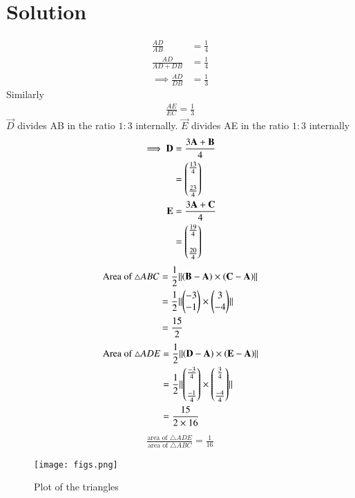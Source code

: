 \documentclass[journal,12pt,twocolumn]{IEEEtran}
\begin{document}
\section{Solution}
\begin{align}
    \frac{AD}{AB}&=\frac{1}{4}\\
    \frac{AD}{AD+DB}&=\frac{1}{4}\\
    \implies \frac{AD}{DB}&=\frac{1}{3}
\end{align}
Similarly
\begin{align}
    \frac{AE}{EC}=\frac{1}{3}
\end{align}
$\vec{D}$ divides AB in the ratio $1:3$ internally. $\vec{E}$ divides AE in the ratio $1:3$ internally
\begin{align}
    \implies \mathbf{D} &=\frac{3\mathbf{A}+\mathbf{B}}{4}\\
    &=\begin{pmatrix}\frac{13}{4}\\\\\frac{23}{4}\end{pmatrix}\\
    \mathbf{E} &=\frac{3\mathbf{A}+\mathbf{C}}{4}\\
    &=\begin{pmatrix}\frac{19}{4}\\\\\frac{20}{4}\end{pmatrix}
\end{align}
\begin{align}
    \text{Area of } \triangle ABC &= \frac{1}{2}\lVert\left(\mathbf{B-A}\right) \times \left(\mathbf{C-A}\right)\rVert\\
    &=\frac{1}{2}\lVert\begin{pmatrix}-3\\-1\end{pmatrix}\times \begin{pmatrix}3\\-4\end{pmatrix}\rVert\\
    &=\frac{15}{2}
\end{align}
\begin{align}
    \text{Area of } \triangle ADE &= \frac{1}{2}\lVert\left(\mathbf{D-A}\right) \times \left(\mathbf{E-A}\right)\rVert\\
    &=\frac{1}{2}\lVert\begin{pmatrix}\frac{-3}{4}\\\\\frac{-1}{4}\end{pmatrix}\times \begin{pmatrix}\frac{3}{4}\\\\\frac{-4}{4}\end{pmatrix}\rVert\\
    &=\frac{15}{2\times16}
\end{align}
\begin{align}
    \frac{\text{area of } \triangle ADE}{\text{area of } \triangle ABC}=\frac{1}{16}
\end{align}
\begin{figure}[!h]
 \centering
 \texttt{[image: figs.png]}
 \caption{Plot of the triangles}
 \label{plot}
\end{figure}
\end{document}
